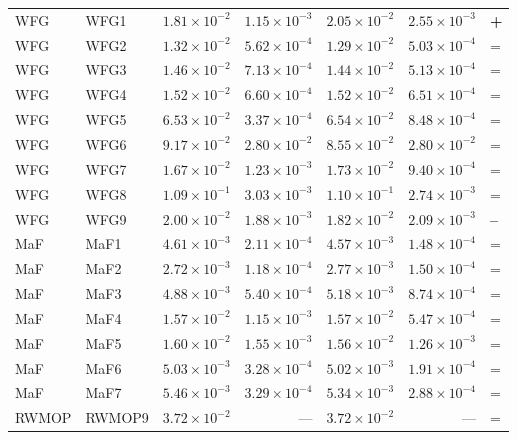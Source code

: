 \begin{table}[t]
\begin{tabular}{llrrrrl}
\addlinespace
WFG & WFG1 & $1.81\!\times\!10^{-2}$ & $1.15\!\times\!10^{-3}$ & $2.05\!\times\!10^{-2}$ & $2.55\!\times\!10^{-3}$ & \textbf{+} \\
WFG & WFG2 & $1.32\!\times\!10^{-2}$ & $5.62\!\times\!10^{-4}$ & $1.29\!\times\!10^{-2}$ & $5.03\!\times\!10^{-4}$ & = \\
WFG & WFG3 & $1.46\!\times\!10^{-2}$ & $7.13\!\times\!10^{-4}$ & $1.44\!\times\!10^{-2}$ & $5.13\!\times\!10^{-4}$ & = \\
WFG & WFG4 & $1.52\!\times\!10^{-2}$ & $6.60\!\times\!10^{-4}$ & $1.52\!\times\!10^{-2}$ & $6.51\!\times\!10^{-4}$ & = \\
WFG & WFG5 & $6.53\!\times\!10^{-2}$ & $3.37\!\times\!10^{-4}$ & $6.54\!\times\!10^{-2}$ & $8.48\!\times\!10^{-4}$ & = \\
WFG & WFG6 & $9.17\!\times\!10^{-2}$ & $2.80\!\times\!10^{-2}$ & $8.55\!\times\!10^{-2}$ & $2.80\!\times\!10^{-2}$ & = \\
WFG & WFG7 & $1.67\!\times\!10^{-2}$ & $1.23\!\times\!10^{-3}$ & $1.73\!\times\!10^{-2}$ & $9.40\!\times\!10^{-4}$ & = \\
WFG & WFG8 & $1.09\!\times\!10^{-1}$ & $3.03\!\times\!10^{-3}$ & $1.10\!\times\!10^{-1}$ & $2.74\!\times\!10^{-3}$ & = \\
WFG & WFG9 & $2.00\!\times\!10^{-2}$ & $1.88\!\times\!10^{-3}$ & $1.82\!\times\!10^{-2}$ & $2.09\!\times\!10^{-3}$ & \textbf{--} \\
\addlinespace
MaF & MaF1 & $4.61\!\times\!10^{-3}$ & $2.11\!\times\!10^{-4}$ & $4.57\!\times\!10^{-3}$ & $1.48\!\times\!10^{-4}$ & = \\
MaF & MaF2 & $2.72\!\times\!10^{-3}$ & $1.18\!\times\!10^{-4}$ & $2.77\!\times\!10^{-3}$ & $1.50\!\times\!10^{-4}$ & = \\
MaF & MaF3 & $4.88\!\times\!10^{-3}$ & $5.40\!\times\!10^{-4}$ & $5.18\!\times\!10^{-3}$ & $8.74\!\times\!10^{-4}$ & = \\
MaF & MaF4 & $1.57\!\times\!10^{-2}$ & $1.15\!\times\!10^{-3}$ & $1.57\!\times\!10^{-2}$ & $5.47\!\times\!10^{-4}$ & = \\
MaF & MaF5 & $1.60\!\times\!10^{-2}$ & $1.55\!\times\!10^{-3}$ & $1.56\!\times\!10^{-2}$ & $1.26\!\times\!10^{-3}$ & = \\
MaF & MaF6 & $5.03\!\times\!10^{-3}$ & $3.28\!\times\!10^{-4}$ & $5.02\!\times\!10^{-3}$ & $1.91\!\times\!10^{-4}$ & = \\
MaF & MaF7 & $5.46\!\times\!10^{-3}$ & $3.29\!\times\!10^{-4}$ & $5.34\!\times\!10^{-3}$ & $2.88\!\times\!10^{-4}$ & = \\
\addlinespace
RWMOP & RWMOP9 & $3.72\!\times\!10^{-2}$ & — & $3.72\!\times\!10^{-2}$ & — & = \\
\bottomrule
\end{tabular}
\end{table}
